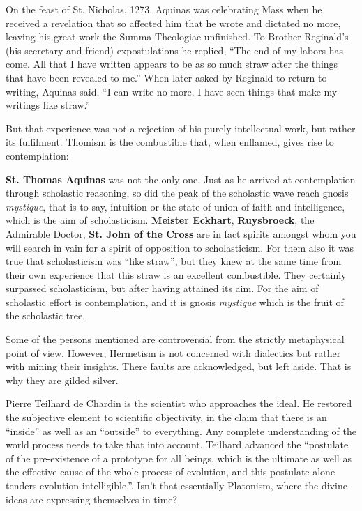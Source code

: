 \begin{quotex}
On the feast of St. Nicholas, 1273, Aquinas was celebrating Mass when he received a revelation that so affected him that he wrote and dictated no more, leaving his great work the Summa Theologiae unfinished. To Brother Reginald's (his secretary and friend) expostulations he replied, ``The end of my labors has come. All that I have written appears to be as so much straw after the things that have been revealed to me.'' When later asked by Reginald to return to writing, Aquinas said, ``I can write no more. I have seen things that make my writings like straw.''
\end{quotex}


But that experience was not a rejection of his purely intellectual work, but rather its fulfilment. Thomism is the combustible that, when enflamed, gives rise to contemplation:

\begin{quotex}
\textbf{St. Thomas Aquinas} was not the only one. Just as he arrived at contemplation through scholastic reasoning, so did the peak of the scholastic wave reach gnosis \emph{mystique}, that is to say, intuition or the state of union of faith and intelligence, which is the aim of scholasticism. \textbf{Meister Eckhart}, \textbf{Ruysbroeck}, the Admirable Doctor, \textbf{St. John of the Cross} are in fact spirits amongst whom you will search in vain for a spirit of opposition to scholasticism. For them also it was true that scholasticism was ``like straw'', but they knew at the same time from their own experience that this straw is an excellent combustible. They certainly surpassed scholasticism, but after having attained its aim. For the aim of scholastic effort is contemplation, and it is gnosis \emph{mystique} which is the fruit of the scholastic tree.
\end{quotex}


Some of the persons mentioned are controversial from the strictly metaphysical point of view. However, Hermetism is not concerned with dialectics but rather with mining their insights. There faults are acknowledged, but left aside. That is why they are gilded silver.

Pierre Teilhard de Chardin is the scientist who approaches the ideal. He restored the subjective element to scientific objectivity, in the claim that there is an ``inside'' as well as an ``outside'' to everything. Any complete understanding of the world process needs to take that into account. Teilhard advanced the ``postulate of the pre-existence of a prototype for all beings, which is the ultimate as well as the effective cause of the whole process of evolution, and this postulate alone tenders evolution intelligible.''. Isn't that essentially Platonism, where the divine ideas are expressing themselves in time?

